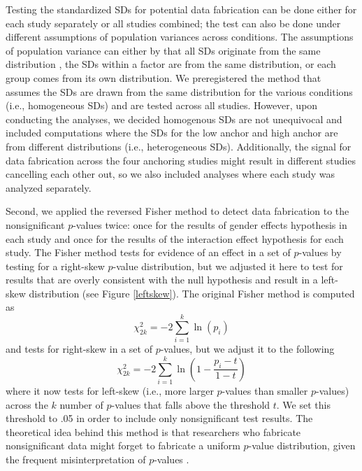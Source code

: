 \documentclass{article}
\begin{document}
Testing the standardized SDs for potential data fabrication can be done either for each study separately or all studies combined; the test can also be done under different assumptions of population variances across conditions. The assumptions of population variance can either by that all SDs originate from the same distribution \citep[as in][]{simonsohn2013}, the SDs within a factor are from the same distribution, or each group comes from its own distribution. We preregistered the method that assumes the SDs are drawn from the same distribution for the various conditions (i.e., homogeneous SDs) and are tested across all studies. However, upon conducting the analyses, we decided homogenous SDs are not unequivocal and included computations where the SDs for the low anchor and high anchor are from different distributions (i.e., heterogeneous SDs). Additionally, the signal for data fabrication across the four anchoring studies might result in different studies cancelling each other out, so we also included analyses where each study was analyzed separately.

Second, we applied the reversed Fisher method to detect data fabrication to the nonsignificant $p$-values twice: once for the results of gender effects hypothesis in each study and once for the results of the interaction effect hypothesis for each study. The Fisher method \citep{fisher1925} tests for evidence of an effect in a set of $p$-values by testing for a right-skew $p$-value distribution, but we adjusted it here to test for results that are overly consistent with the null hypothesis and result in a left-skew distribution (see Figure \ref{leftskew}). The original Fisher method is computed as
\begin{equation}
\chi^2_{2k}=-2\sum\limits^k_{i=1}\ln(p_i)
\label{fishertest}
\end{equation}
and tests for right-skew in a set of $p$-values, but we adjust it to the following
\begin{equation}
\chi^2_{2k}=-2\sum\limits^k_{i=1}\ln(1-\frac{p_i-t}{1-t})
\label{fisheradjusted}
\end{equation}
where it now tests for left-skew (i.e., more larger $p$-values than smaller $p$-values) across the $k$ number of $p$-values that falls above the threshold $t$. We set this threshold to .05 in order to include only nonsignificant test results. The theoretical idea behind this method is that researchers who fabricate nonsignificant data might forget to fabricate a uniform $p$-value distribution, given the frequent misinterpretation of $p$-values \citep[e.g., as the probability of an effect,][]{Goodman2008135,Altman_1995}. %
\end{document}
